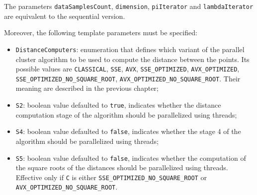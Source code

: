 \documentclass{article}
\begin{document}
The parameters \texttt{dataSamplesCount}, \texttt{dimension},
\texttt{piIterator} and \texttt{lambdaIterator} are equivalent to the
sequential version.

Moreover, the following template parameters must be specified:

\begin{itemize}
\item
  \texttt{DistanceComputers}: enumeration that defines which variant of
  the parallel cluster algorithm to be used to compute the distance
  between the points. Its possible values are \texttt{CLASSICAL},
  \texttt{SSE}, \texttt{AVX}, \texttt{SSE\_OPTIMIZED},
  \texttt{AVX\_OPTIMIZED}, \texttt{SSE\_OPTIMIZED\_NO\_SQUARE\_ROOT},
  \texttt{AVX\_OPTIMIZED\_NO\_SQUARE\_ROOT}. Their meaning are described
  in the previous chapter;
\item
  \texttt{S2}: boolean value defaulted to \texttt{true}, indicates
  whether the distance computation stage of the algorithm should be
  parallelized using threads;
\item
  \texttt{S4}: boolean value defaulted to \texttt{false}, indicates
  whether the stage 4 of the algorithm should be parallelized using
  threads;
\item
  \texttt{S5}: boolean value defaulted to \texttt{false}, indicates
  whether the computation of the square roots of the distances should be
  parallelized using threads. Effective only if \texttt{C} is either
  \texttt{SSE\_OPTIMIZED\_NO\_SQUARE\_ROOT} or
  \texttt{AVX\_OPTIMIZED\_NO\_SQUARE\_ROOT}.
\end{itemize}
\end{document}
